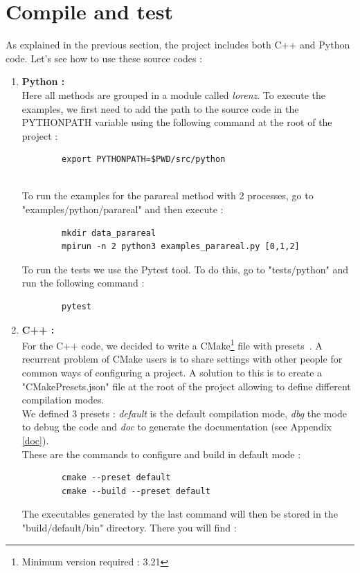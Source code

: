 \newpage

\section{Compile and test}
\label{compile}

	As explained in the previous section, the project includes both C++ and Python code. Let's see how to use these source codes :
	\begin{enumerate}[label=\textbullet]
		\item \textbf{Python :} \\
		Here all methods are grouped in a module called \textit{lorenz}. To execute the examples, we first need to add the path to the source code in the PYTHONPATH variable using the following command at the root of the project :
\begin{lstlisting}
		export PYTHONPATH=$PWD/src/python
\end{lstlisting}
		 \\
		To run the examples for the parareal method with 2 processes, go to "examples/python/parareal" and then execute :
\begin{lstlisting}
		mkdir data_parareal
		mpirun -n 2 python3 examples_parareal.py [0,1,2]
\end{lstlisting}
		To run the tests we use the Pytest tool. To do this, go to "tests/python" and run the following command :
\begin{lstlisting}
		pytest
\end{lstlisting}
		\item \textbf{C++ :} \\
		For the C++ code, we decided to write a CMake\footnote[1]{Minimum version required : 3.21} file with presets~\cite{cmake_preset}.  A recurrent problem of CMake users is to share settings with other people for common ways of configuring a project. A solution to this is to create a "CMakePresets.json" file at the root of the project allowing to define different compilation modes. \\
		We defined 3 presets : \textit{default} is the default compilation mode, \textit{dbg} the mode to debug the code and \textit{doc} to generate the documentation (see Appendix \ref{doc}). \\
		These are the commands to configure and build in default mode :
\begin{lstlisting}
		cmake --preset default
		cmake --build --preset default
\end{lstlisting}
		The executables generated by the last command will then be stored in the "build/default/bin" directory. There you will find :

\end{enumerate}

